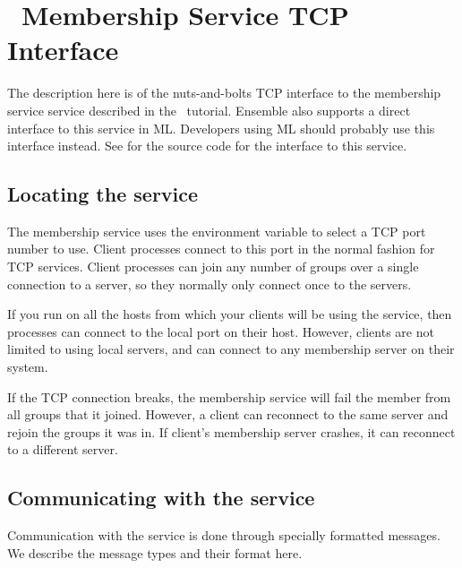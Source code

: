 \newenvironment{FormatTable}{%
\begin{quote}\begin{tabular}{|l|l|} \hline
}{\end{tabular}\end{quote}
}
\newcommand {\formatentry}[2]    {#1 & #2 \\ \hline}

\section{\ensemble\ Membership Service TCP Interface}
\label{section:memership}


The description here is of the nuts-and-bolts TCP interface to the
 membership service service described in the
\ensemble\ tutorial.  Ensemble also supports a direct interface to
this service in ML.  Developers using ML should probably use this
interface instead.  See  for the source
code for the interface to this service.

\subsection{Locating the service}
The membership service uses the environment variable
 to select a TCP port number to use.  Client
processes connect to this port in the normal fashion for TCP
services.  Client processes can join any number of groups over a
single connection to a server, so they normally only connect once to
the servers.

If you run  on all the hosts from which your clients
will be using the service, then processes can connect to the local
port on their host.  However, clients are not limited to using local
servers, and can connect to any membership server on their system.

If the TCP connection breaks, the membership service will fail the
member from all groups that it joined.  However, a client can
reconnect to the same server and rejoin the groups it was in.  If
client's membership server crashes, it can reconnect to a different
server.

\subsection{Communicating with the service}
Communication with the service is done through specially formatted
messages.  We describe the message types and their format here.

